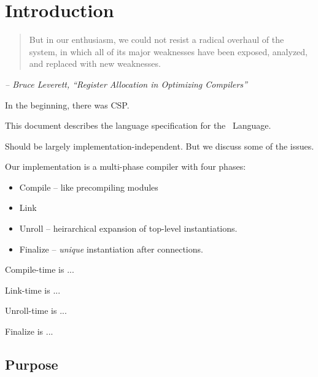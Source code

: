 

\chapter{Introduction}
\label{sec:intro}

\begin{quotation}
But in our enthusiasm, we could not resist a radical overhaul of the
system, in which all of its major weaknesses have been exposed,
analyzed, and replaced with new weaknesses.
\end{quotation}

\begin{flushright}
{\itshape -- Bruce Leverett, ``Register Allocation in Optimizing Compilers''}
\end{flushright}

\bigskip


In the beginning, there was CSP\cite{ref:csp}.

This document describes the language specification for the \hac\ Language.  

Should be largely implementation-independent.  
But we discuss some of the issues.  

Our implementation is a multi-phase compiler with four phases:
\begin{itemize}
\item Compile -- like precompiling modules
\item Link
\item Unroll -- heirarchical expansion of top-level instantiations.  
\item Finalize -- \emph{unique} instantiation after connections.  
\end{itemize}

Compile-time is ...

Link-time is ...

Unroll-time is ...

Finalize is ...



\section{Purpose}
\label{sec:intro:purpose}

